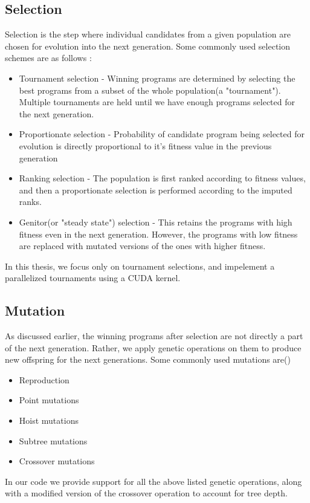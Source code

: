 \subsection{Selection}
\label{subsec:selection}
Selection is the step where individual candidates from a given population are chosen for evolution into the next generation. Some commonly used selection schemes are as follows \cite{GOLDBERG199169}:
\begin{itemize}
  \item Tournament selection - Winning programs are determined by selecting the best programs from a subset of the whole population(a "tournament"). Multiple tournaments are held until we have enough programs selected for the next generation. 
  \item Proportionate selection - Probability of candidate program being selected for evolution is directly proportional to it's fitness value in the previous generation
  \item Ranking selection - The population is first ranked according to fitness values, and then a proportionate selection is performed according to the imputed ranks. 
  \item Genitor(or "steady state") selection - This retains the programs with high fitness even in the next generation. However, the programs with low fitness are replaced with mutated versions of the ones with higher fitness.
\end{itemize}

In this thesis, we focus only on tournament selections, and impelement a parallelized tournaments using a CUDA kernel. 
\subsection{Mutation}
\label{subsec:mutation}
As discussed earlier, the winning programs after selection are not directly a part of the next generation. Rather, we apply genetic operations on them to produce new offspring for the next generations. Some commonly used mutations are(\citep{gplearn})
\begin{itemize}
  \item Reproduction
  \item Point mutations
  \item Hoist mutations
  \item Subtree mutations
  \item Crossover mutations
\end{itemize}
In our code we provide support for all the above listed genetic operations, along with a modified version of the crossover operation to account for tree depth.

